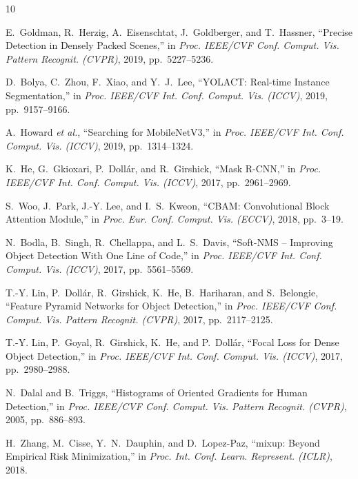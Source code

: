 \documentclass[conference]{IEEEtran}
\begin{document}
\begin{thebibliography}{10}

E.~Goldman, R.~Herzig, A.~Eisenschtat, J.~Goldberger, and T.~Hassner,
``Precise Detection in Densely Packed Scenes,''
in \emph{Proc. IEEE/CVF Conf. Comput. Vis. Pattern Recognit. (CVPR)},
2019, pp.~5227--5236.

D.~Bolya, C.~Zhou, F.~Xiao, and Y.~J.~Lee,
``YOLACT: Real-time Instance Segmentation,''
in \emph{Proc. IEEE/CVF Int. Conf. Comput. Vis. (ICCV)},
2019, pp.~9157--9166.

A.~Howard \emph{et al.},
``Searching for MobileNetV3,''
in \emph{Proc. IEEE/CVF Int. Conf. Comput. Vis. (ICCV)},
2019, pp.~1314--1324.

K.~He, G.~Gkioxari, P.~Doll{\'a}r, and R.~Girshick,
``Mask R-CNN,''
in \emph{Proc. IEEE/CVF Int. Conf. Comput. Vis. (ICCV)},
2017, pp.~2961--2969.

S.~Woo, J.~Park, J.-Y. Lee, and I.~S.~Kweon,
``CBAM: Convolutional Block Attention Module,''
in \emph{Proc. Eur. Conf. Comput. Vis. (ECCV)},
2018, pp.~3--19.

N.~Bodla, B.~Singh, R.~Chellappa, and L.~S.~Davis,
``Soft-NMS -- Improving Object Detection With One Line of Code,''
in \emph{Proc. IEEE/CVF Int. Conf. Comput. Vis. (ICCV)},
2017, pp.~5561--5569.

T.-Y. Lin, P.~Doll{\'a}r, R.~Girshick, K.~He, B.~Hariharan, and
S.~Belongie,
``Feature Pyramid Networks for Object Detection,''
in \emph{Proc. IEEE/CVF Conf. Comput. Vis. Pattern Recognit. (CVPR)},
2017, pp.~2117--2125.

T.-Y. Lin, P.~Goyal, R.~Girshick, K.~He, and P.~Doll{\'a}r,
``Focal Loss for Dense Object Detection,''
in \emph{Proc. IEEE/CVF Int. Conf. Comput. Vis. (ICCV)},
2017, pp.~2980--2988.

N.~Dalal and B.~Triggs,
``Histograms of Oriented Gradients for Human Detection,''
in \emph{Proc. IEEE/CVF Conf. Comput. Vis. Pattern Recognit. (CVPR)},
2005, pp.~886--893.

H.~Zhang, M.~Cisse, Y.~N.~Dauphin, and D.~Lopez-Paz,
``mixup: Beyond Empirical Risk Minimization,''
in \emph{Proc. Int. Conf. Learn. Represent. (ICLR)},
2018.

\end{thebibliography}
\end{document}
